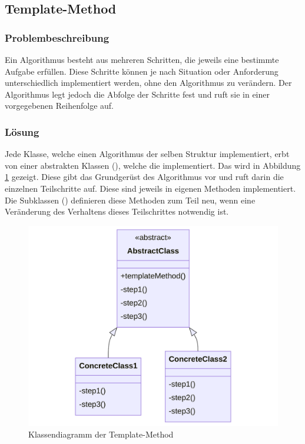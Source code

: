 \subsection{Template-Method}

\subsubsection*{Problembeschreibung}

Ein Algorithmus besteht aus mehreren Schritten, die jeweils eine bestimmte Aufgabe erfüllen. Diese Schritte können je nach Situation oder Anforderung unterschiedlich implementiert werden, ohne den Algorithmus zu verändern. Der Algorithmus legt jedoch die Abfolge der Schritte fest und ruft sie in einer vorgegebenen Reihenfolge auf. \cite{gamma_design_1995}

\subsubsection*{Lösung}

Jede Klasse, welche einen Algorithmus der selben Struktur implementiert, erbt von einer abstrakten Klassen (), welche die  implementiert. Das wird in Abbildung \ref{fig:template-method-class} gezeigt. Diese gibt das Grundgerüst des Algorithmus vor und ruft darin die einzelnen Teilschritte auf. Diese sind jeweils in eigenen Methoden implementiert. Die Subklassen () definieren diese Methoden zum Teil neu, wenn eine Veränderung des Verhaltens dieses Teilschrittes notwendig ist.

\begin{figure}[H]
	\centering
	\includegraphics[width=0.75\linewidth]{images/patterns/template-method-class.png}
	\caption{Klassendiagramm der Template-Method \cite{skobeleva_template_2023}}
	\label{fig:template-method-class}
\end{figure}

